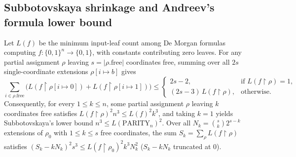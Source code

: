 \begin{result}
\subsection{Subbotovskaya shrinkage and Andreev's formula lower bound}
Let $L(f)$ be the minimum input-leaf count among De Morgan formulas computing
$f:\{0,1\}^n\to\{0,1\}$, with constants contributing zero leaves. For any
partial assignment $\rho$ leaving $s=|\rho.\mathrm{free}|$ coordinates free,
summing over all $2s$ single-coordinate extensions $\rho[i\mapsto b]$ gives
\[
\sum_{i\in\rho.\mathrm{free}}
  \bigl(L(f\upharpoonright\rho[i\mapsto0])+L(f\upharpoonright\rho[i\mapsto1])\bigr)
\le
\begin{cases}
2s-2, & \text{if } L(f\upharpoonright\rho)=1,\\
(2s-3)\,L(f\upharpoonright\rho), & \text{otherwise.}
\end{cases}
\]
Consequently, for every $1\le k\le n$, some partial assignment $\rho$ leaving
$k$ coordinates free satisfies $L(f\upharpoonright\rho)^2 n^3 \le L(f)^2 k^3$,
and taking $k=1$ yields Subbotovskaya's lower bound
$n^3\le L(\mathrm{PARITY}_n)^2$. Over all $N_k=\binom{s}{k}2^{s-k}$ extensions
of $\rho_0$ with $1\le k\le s$ free coordinates, the sum
$S_k=\sum_{\rho}L(f\upharpoonright\rho)$ satisfies
$(S_k-k N_k)^2 s^3\le L(f\upharpoonright\rho_0)^2 k^3 N_k^2$
($S_k-k N_k$ truncated at $0$).


\end{result}
